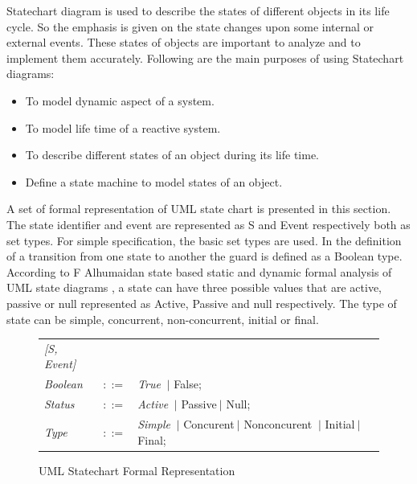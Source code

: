 Statechart diagram is used to describe the states of different objects in its life cycle. So the emphasis is given on the state changes upon some internal or external events. These states of objects are important to analyze and to implement them accurately. Following are the main purposes of using Statechart diagrams:

\begin{itemize}
	\item To model dynamic aspect of a system.
	
	\item To model life time of a reactive system.
	
	\item To describe different states of an object during its life time.
	
	\item Define a state machine to model states of an object.
\end{itemize}

A set of formal representation of UML state chart is presented in this section. The state identifier and event are represented as S and Event respectively both as set types. For simple specification, the basic set types are used. In the definition of a transition from one state to another the guard is defined as a Boolean type. According to F Alhumaidan state based static and dynamic formal analysis of UML state diagrams \cite{ref_16_alhumaidan2012state} , a state can have three possible values that are active, passive or null represented as Active, Passive and null respectively. The type of state can be simple, concurrent, non-concurrent, initial or final.

\begin{figure}[ht!]
	\centering
	\begin{tabular}{lll}
		\footnotesize                       
		\textit{[S, Event]}          &\footnotesize \\
		
		\footnotesize
		\textit{Boolean}            &\footnotesize $::=$         &\footnotesize \textit{True} $\ \vert $ {False};       \\   
		\footnotesize
		\textit{Status}            &\footnotesize $::=$         &\footnotesize \textit{Active}
		 $\ \vert $ {Passive}$\ \vert $ {Null};       \\ 
		\footnotesize
		\textit{Type}            &\footnotesize $::=$         &\footnotesize \textit{Simple}
		 	$\ \vert $ {Concurent}$\ \vert $ {Nonconcurent} $\ \vert $ {Initial}$\ \vert $ {Final};       \\	 	 
		
	\end{tabular}
	\caption{UML Statechart Formal Representation}
	\label{statechart_formal_representation}
\end{figure}

